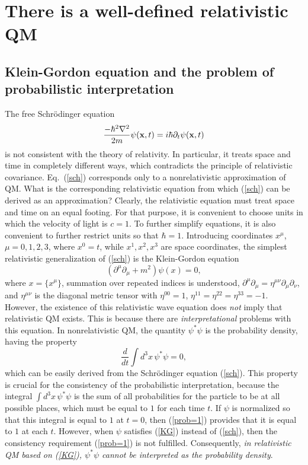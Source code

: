 \documentclass[12pt]{article}
\begin{document}
\section{There is a well-defined relativistic QM}
\label{RQM}

\subsection{Klein-Gordon equation and the problem of probabilistic 
interpretation}

The free Schr\"odinger equation
\begin{equation}\label{sch}
\frac{-\hbar^2 \nabla^2}{2m} \psi({\bf x},t)=
i\hbar \partial_t \psi({\bf x},t) 
\end{equation}
is not consistent with the theory of relativity. 
In particular, it treats space and time in completely different 
ways, which contradicts the principle of relativistic covariance.
Eq.~(\ref{sch}) 
corresponds only to a nonrelativistic approximation of QM.
What is the corresponding relativistic equation from which 
(\ref{sch}) can be derived as an approximation?
Clearly, the relativistic equation must treat space and time 
on an equal footing. For that purpose, it is convenient 
to choose units in which the velocity of light is $c=1$. 
To further simplify equations, it is also convenient to 
further restrict units so that $\hbar=1$. Introducing
coordinates $x^{\mu}$, $\mu=0,1,2,3$, where $x^0=t$, while 
$x^1,x^2,x^3$ are space coordinates, the simplest
relativistic generalization of (\ref{sch}) is the 
Klein-Gordon equation
\begin{equation}\label{KG}
(\partial^{\mu}\partial_{\mu}+m^2)\psi(x)=0,
\end{equation}
where $x=\{ x^{\mu} \}$, summation over repeated indices is understood,
$\partial^{\mu}\partial_{\mu}=\eta^{\mu\nu}\partial_{\mu}\partial_{\nu}$,
and $\eta^{\mu\nu}$ is the diagonal metric tensor with 
$\eta^{00}=1$, $\eta^{11}=\eta^{22}=\eta^{33}=-1$. 
However, the existence of this relativistic wave equation does {\em not}
imply that relativistic QM exists. This is because there 
are {\em interpretational} problems with this equation.
In nonrelativistic QM, the quantity $\psi^*\psi$ is the probability 
density, having the property 
\begin{equation}\label{prob=1}
\frac{d}{dt}\int d^3x\, \psi^*\psi =0, 
\end{equation}
which can be easily derived from the Schr\"odinger equation (\ref{sch}).
This property is crucial for the consistency of the probabilistic 
interpretation, because the integral
$\int d^3x\, \psi^*\psi$ is the sum of 
all probabilities for the particle to be at all possible places, 
which must be equal to $1$ for each time $t$. If $\psi$ is normalized 
so that this integral is equal to $1$ at $t=0$, then (\ref{prob=1}) 
provides that it is equal to $1$ at each $t$. 
However, when $\psi$ satisfies (\ref{KG}) instead of 
(\ref{sch}), then the consistency requirement (\ref{prob=1}) is not 
fulfilled. Consequently, {\em in relativistic QM based on 
(\ref{KG}), $\psi^*\psi$ cannot be interpreted as the 
probability density}.
\end{document}
